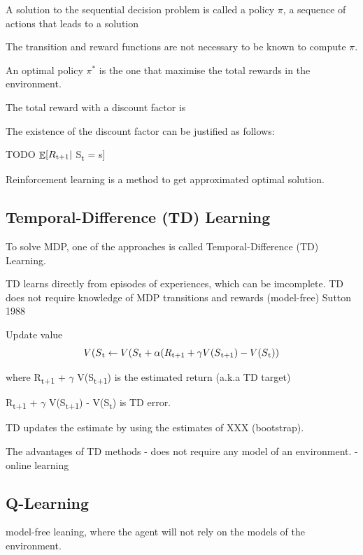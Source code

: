 \documentclass[12pt,twoside]{report}
\DeclareMathOperator{\E}{\mathbb{E}}
\begin{document}
A solution to the sequential decision problem is called a policy $\pi$, a sequence of actions that leads to a solution

The transition and reward functions are not necessary to be known to compute $\pi$.

An optimal policy $\pi^*$ is the one that maximise the total rewards in the environment.

The total reward with a discount factor is



The existence of the discount factor can be justified as follows:

TODO
$\displaystyle \E[R\textsubscript{t+1} \vert$ S\textsubscript{t} = s]


Reinforcement learning is a method to get approximated optimal solution.


\subsection{Temporal-Difference (TD) Learning}

To solve MDP, one of the approaches is called Temporal-Difference (TD) Learning.

TD learns directly from episodes of experiences, which can be imcomplete.
TD does not require knowledge of MDP transitions and rewards (model-free)
Sutton 1988

Update value
\begin{equation}
V(S\textsubscript{t} \leftarrow V(S\textsubscript{t} + \alpha (R\textsubscript{t+1} + \gamma V(S\textsubscript{t+1}) - V(S\textsubscript{t}))
\end{equation}

where R\textsubscript{t+1} + $\gamma$ V(S\textsubscript{t+1}) is the estimated return (a.k.a TD target)

R\textsubscript{t+1} + $\gamma$ V(S\textsubscript{t+1}) - V(S\textsubscript{t}) is TD error.

TD updates the estimate by using the estimates of XXX (bootstrap).

The advantages of TD methods
- does not require any model of an environment.
- online learning
\subsection{Q-Learning}

model-free leaning, where the agent will not rely on the models of the environment.
\end{document}
